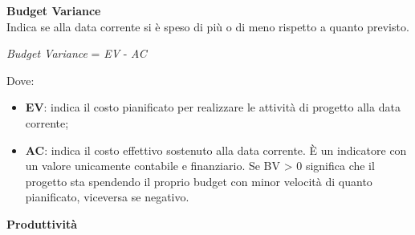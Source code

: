 \textbf{Budget Variance}\\

Indica se alla data corrente si \`e speso di pi\`u o di meno rispetto a quanto previsto.\\
\begin{center}
	\textit{Budget Variance} = \textit{EV} - \textit{AC}
\end{center}
Dove:
\begin{itemize}
	\item \textbf{EV}: indica il costo pianificato per realizzare le attività di progetto alla data corrente;
	\item \textbf{AC}: indica il costo effettivo sostenuto alla data corrente. \`E un indicatore con
un valore unicamente contabile e finanziario. Se BV > 0 significa che il progetto sta spendendo
il proprio budget con minor velocità di quanto pianificato, viceversa se negativo.
\end{itemize}

\textbf{Produttività}\\

